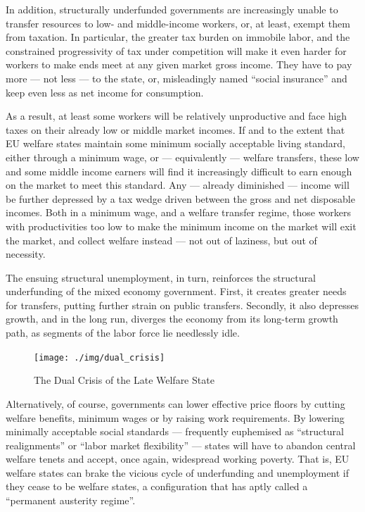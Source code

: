 \documentclass[11pt,a4paper,oneside,openright]{article}
\begin{document}
In addition, structurally underfunded governments are increasingly unable to transfer resources to low- and middle-income workers, or, at least, exempt them from taxation. 
In particular, the greater tax burden on immobile labor, and the constrained progressivity of tax under competition will make it even harder for workers to make ends meet at any given market gross income. 
They have to pay more --- not less --- to the state, or, misleadingly named ``social insurance'' and keep even less as net income for consumption.

As a result, at least some workers will be relatively unproductive and face high taxes on their already low or middle market incomes. 
If and to the extent that \gls{EU} welfare states maintain some minimum socially acceptable living standard, either through a minimum wage, or --- equivalently --- welfare transfers, these low and some middle income earners will find it increasingly difficult to earn enough on the market to meet this standard. 
Any --- already diminished --- income will be further depressed by a tax wedge driven between the gross and net disposable incomes. 
Both in a minimum wage, and a welfare transfer regime, those workers with productivities too low to make the minimum income on the market will exit the market, and collect welfare instead --- not out of laziness, but out of necessity. 

The ensuing structural unemployment, in turn, reinforces the structural underfunding of the mixed economy government. 
First, it creates greater needs for transfers, putting further strain on public transfers. 
Secondly, it also depresses growth, and in the long run, diverges the economy from its long-term growth path, as segments of the labor force lie needlessly idle.

\begin{figure}[htbp]
	\begin{center}
	\texttt{[image: ./img/dual\_crisis]}  
	\caption{The Dual Crisis of the Late Welfare State}
	\label{fig:dual_crisis}
	\end{center}
\end{figure} %

Alternatively, of course, governments can lower effective price floors by cutting welfare benefits, minimum wages or by raising work requirements. 
By lowering minimally acceptable social standards --- frequently euphemised as ``structural realignments'' or ``labor market flexibility'' --- states will have to abandon central welfare tenets and accept, once again, widespread working poverty. 
That is, \gls{EU} welfare states can brake the vicious cycle of underfunding and unemployment if they cease to be welfare states, a configuration that \cite{Streeck2010c} has aptly called a ``permanent austerity regime''. 
\end{document}
